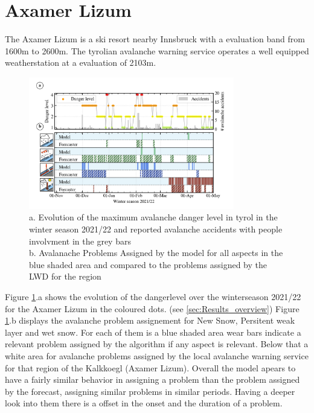 \section{Axamer Lizum} \label{sec:results_AXLIZ}

The Axamer Lizum is a ski resort nearby Innsbruck with a evaluation band from 1600m to 2600m. The tyrolian avalanche warning
service operates a well equipped weatherstation at a evaluation of 2103m. 

\begin{figure}[h]
    \centering
    \includegraphics[width=0.8\textwidth]{Figures/figures_avapro/AXLIZ/AXLIZ_all.png}
    \caption{ a. Evolution of the maximum avalanche danger level in tyrol in the winter season
     2021/22 and reported avalanche accidents with people involvment in the grey bars \\
     b. Avalanache Problems Assigned by the model for all aspects in the blue shaded area and compared to the 
     problems assigned by the LWD for the region}
    \label{fig:avapro_AXLIZ_all}
\end{figure}

\noindent Figure \ref{fig:avapro_AXLIZ_all}.a shows the evolution of the dangerlevel over the winterseason 2021/22 for the Axamer
Lizum in the coloured dots. (see \ref{sec:Results_overview}) Figure \ref{fig:avapro_AXLIZ_all}.b displays the avalanche problem
assignement for New Snow, Persitent weak layer and wet snow. For each of them is a blue shaded area wear bars indicate a relevant
problem assigned by the algorithm if any aspect is relevant. Below that a white area for avalanche problems assigned by the 
local avalanche warning service for that region of the Kalkkoegl (Axamer Lizum). Overall the model apears to have a fairly similar
behavior in assigning a problem than the problem assigned by the forecast, assigning similar problems in similar periods. Having a
deeper look into them there is a offset in the onset and the duration of a problem.



